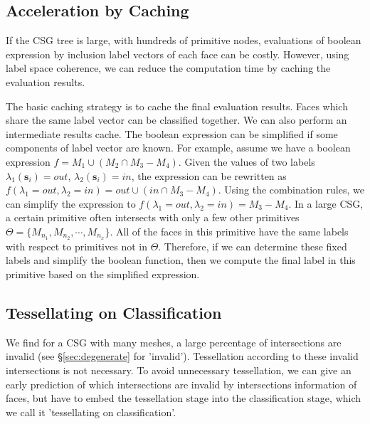 \subsection{Acceleration by Caching}
\label{sec:acc}


If the CSG tree is large, with hundreds of primitive nodes, evaluations of boolean expression by inclusion label vectors of each face can be costly. However, using label space coherence, we can reduce the computation time by caching the evaluation results.


The basic caching strategy is to cache the final evaluation results. Faces which share the same label vector can be classified together. We can also perform an intermediate results cache. The boolean expression can be simplified if some components of label vector are known. For example, assume we have a boolean expression $f = M_1\cup (M_2\cap M_3-M_4)$. Given the values of two labels $\lambda_1(\bm{s}_i)=out$, $\lambda_2(\bm{s}_i)=in$, the expression can be rewritten as $f(\lambda_1=out, \lambda_2=in)=out\cup (in\cap M_3-M_4)$. Using the combination rules, we can simplify the expression to $f(\lambda_1=out, \lambda_2=in)=M_3-M_4$.
In a large CSG, a certain primitive often intersects with only a few other primitives $\Theta= \{M_{n_1}, M_{n_2}, \cdots, M_{n_x}\}$. All of the faces in this primitive have the same labels with respect to primitives not in $\Theta$. Therefore, if we can determine these fixed labels and simplify the boolean function, then we compute the final label in this primitive based on the simplified expression.


\iffalse
\subsection{Tessellating on Classification}
We find for a CSG with many meshes, a large percentage of intersections are invalid (see \S\ref{sec:degenerate} for 'invalid'). Tessellation according to these invalid intersections is not necessary. To avoid unnecessary tessellation, we can give an early prediction of which intersections are invalid by intersections information of faces, but have to embed the tessellation stage into the classification stage, which we call it 'tessellating on classification'.

